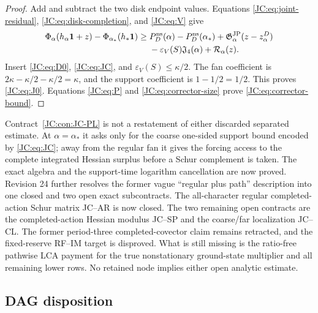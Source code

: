 \begin{proof}
Add and subtract the two disk endpoint values.  Equations
\eqref{JC:eq:joint-residual}, \eqref{JC:eq:disk-completion}, and \eqref{JC:eq:V}
give
\begin{align*}
 \Phi_\alpha(h_\alpha\mathbf1+z)
 -\Phi_{\alpha_*}(h_*\mathbf1)
 \ge{}&P_D^{\rm ns}(\alpha)-P_D^{\rm ns}(\alpha_*)
       +\mathfrak G^{\rm JP}_\alpha(z-z_\alpha^D)\\
 &-\varepsilon_V(S)\mathfrak J_4(\alpha)+\mathcal{R}_\alpha(z).
\end{align*}
Insert \eqref{JC:eq:D0}, \eqref{JC:eq:JC}, and
$\varepsilon_V(S)\le\kappa/2$.  The fan coefficient is
$2\kappa-\kappa/2-\kappa/2=\kappa$, and the support coefficient is
$1-1/2=1/2$.  This proves \eqref{JC:eq:J0}.  Equations \eqref{JC:eq:P} and
\eqref{JC:eq:corrector-size} prove \eqref{JC:eq:corrector-bound}.
\end{proof}

\begin{remark}
Contract~\ref{JC:con:JC-PL} is not a restatement of either discarded separated
estimate.  At $\alpha=\alpha_*$ it asks only for the coarse one-sided
support bound encoded by \eqref{JC:eq:JC}; away from the regular fan it gives
the forcing access to the complete integrated Hessian surplus before a
Schur complement is taken.  The exact algebra and the support-time
logarithm cancellation are now proved.  Revision 24 further resolves the
former vague ``regular plus path'' description into one closed and two
open exact subcontracts.  The all-character regular completed-action Schur matrix
JC--AR is now closed.  The two remaining open contracts are the
completed-action Hessian modulus JC--SP and the coarse/far localization
JC--CL.  The former period-three completed-covector claim remains
retracted, and the fixed-reserve RF--IM target is disproved.  What is
still missing is the ratio-free
pathwise LCA payment for the true nonstationary ground-state multiplier and
all remaining lower rows.  No retained node implies either open analytic
estimate.
\end{remark}

\subsection{DAG disposition}

